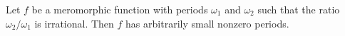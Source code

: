 Let $f$ be a meromorphic function with periods $\omega_1$ and $\omega_2$ such that the ratio $\omega_2/\omega_1$ is irrational. Then $f$ has arbitrarily small nonzero periods.
